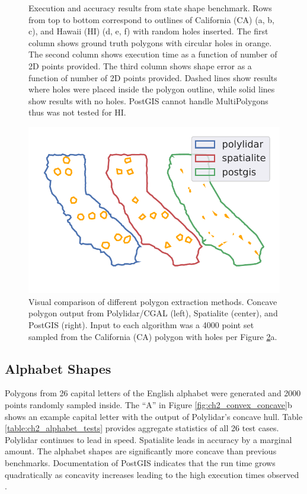 \begin{figure}[ht]
\begin{subfigure}[t]{.33\linewidth}
    \caption{}
    \label{fig:ch2_hi_acc}
  \end{subfigure}
  \caption[Execution and accuracy results from state shape benchmark]{Execution and accuracy results from state shape benchmark. Rows from top to bottom correspond to outlines of California (CA) (a, b, c), and Hawaii (HI) (d, e, f) with random holes inserted. The first column shows ground truth polygons with circular holes in orange. The second column shows execution time as a function of number of 2D points provided. The third column shows shape error as a function of number of 2D points provided. Dashed lines show results where holes were placed inside the polygon outline, while solid lines show results with no holes. PostGIS cannot handle MultiPolygons thus was not tested for HI.}
  \label{fig:ch2_compare_algs_all} 
\end{figure}

\begin{figure}[!ht] 
    \centering
      \includegraphics[clip, trim=0.5cm 1.2cm 0.0cm 0.0cm, width=0.35\linewidth]{chapter_2_polylidar/imgs/ouput_ca.pdf}
  \caption[Visual comparison of different polygon extraction methods]{Visual comparison of different polygon extraction methods. Concave polygon output from Polylidar/CGAL (left), Spatialite (center), and PostGIS (right).  Input to each algorithm was a 4000 point set sampled from the California (CA) polygon with holes per Figure \ref{fig:ch2_compare_algs_all}a.}
  \label{fig:ch2_ca_output} 
\end{figure}





\subsection{Alphabet Shapes}\label{sec:ch2_alphabet_shapes}

Polygons from 26 capital letters of the English alphabet were generated and 2000 points randomly sampled inside.
The ``A'' in Figure \ref{fig:ch2_convex_concave}b shows an example capital letter with the output of Polylidar's concave hull. Table \ref{table:ch2_alphabet_tests} provides aggregate statistics of all 26 test cases. Polylidar continues to lead in speed. Spatialite leads in accuracy by a marginal amount. The alphabet shapes are significantly more concave than previous benchmarks. Documentation of PostGIS indicates that the run time grows quadratically as concavity increases leading to the high execution times observed \cite{open_source_geospatial_foundation_postgis_2019}.

